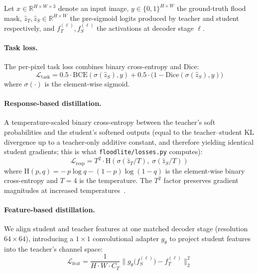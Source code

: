 Let $x \in \mathbb{R}^{H \times W \times 3}$ denote an input image, $y \in \{0,1\}^{H \times W}$ the ground-truth flood mask, $\hat{z}_T, \hat{z}_S \in \mathbb{R}^{H \times W}$ the pre-sigmoid logits produced by teacher and student respectively, and $f_T^{(\ell)}, f_S^{(\ell)}$ the activations at decoder stage $\ell$.

\paragraph{Task loss.} The per-pixel task loss combines binary cross-entropy and Dice:
\begin{equation}
\mathcal{L}_{\mathrm{task}} = 0.5 \cdot \mathrm{BCE}(\sigma(\hat{z}_S), y) + 0.5 \cdot \bigl(1 - \mathrm{Dice}(\sigma(\hat{z}_S), y)\bigr)
\label{eq:task}
\end{equation}
where $\sigma(\cdot)$ is the element-wise sigmoid.

\paragraph{Response-based distillation.} A temperature-scaled binary cross-entropy between the teacher's soft probabilities and the student's softened outputs (equal to the teacher--student KL divergence up to a teacher-only additive constant, and therefore yielding identical student gradients; this is what \texttt{floodlite/losses.py} computes):
\begin{equation}
\mathcal{L}_{\mathrm{resp}} = T^{2} \cdot \mathrm{H}\!\left(\sigma(\hat{z}_T / T),\;\sigma(\hat{z}_S / T)\right)
\label{eq:resp}
\end{equation}
where $\mathrm{H}(p,q) = -\,p\log q - (1-p)\log(1-q)$ is the element-wise binary cross-entropy and $T=4$ is the temperature. The $T^{2}$ factor preserves gradient magnitudes at increased temperatures~\cite{hinton2015distilling}.

\paragraph{Feature-based distillation.} We align student and teacher features at one matched decoder stage (resolution $64{\times}64$), introducing a $1{\times}1$ convolutional adapter $g_\theta$ to project student features into the teacher's channel space:
\begin{equation}
\mathcal{L}_{\mathrm{feat}} = \frac{1}{H \cdot W \cdot C_T} \bigl\| g_\theta\bigl(f_S^{(\ell)}\bigr) - f_T^{(\ell)} \bigr\|_{2}^{2}
\label{eq:feat}
\end{equation}

